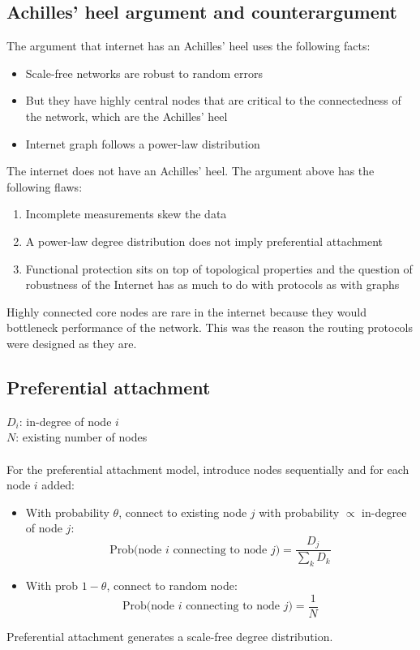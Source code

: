 \documentclass{article}
\begin{document}
\subsection{Achilles' heel argument and counterargument}

The argument that internet has an Achilles' heel uses the following facts:
\begin{itemize}
\item Scale-free networks are robust to random errors
\item But they have highly central nodes that are critical to the connectedness of the network, which are the Achilles' heel
\item Internet graph follows a power-law distribution
\end{itemize}
The internet does not have an Achilles' heel. The argument above has the following flaws:
\begin{enumerate}
\item Incomplete measurements skew the data
\item A power-law degree distribution does not imply preferential attachment
\item Functional protection sits on top of topological properties and the question of
robustness of the Internet has as much to do with protocols as with graphs
\end{enumerate}
Highly connected core nodes are rare in the internet because they would bottleneck performance of the network. This was the reason the routing protocols were designed as they are.

\subsection{Preferential attachment}

$D_i$: in-degree of node $i$ \\
$N$: existing number of nodes \\
\\
For the preferential attachment model, introduce nodes sequentially and for each node $i$ added:
\begin{itemize}
\item With probability $\theta$, connect to existing node $j$ with probability $\propto$ in-degree of node $j$:
$$\text{Prob(node } i \text{ connecting to node } j) = \frac{D_j}{\sum_k D_k}$$
\item With prob $1 - \theta$, connect to random node:
$$\text{Prob(node } i \text{ connecting to node } j) = \frac{1}{N}$$
\end{itemize}
Preferential attachment generates a scale-free degree distribution.
\end{document}
